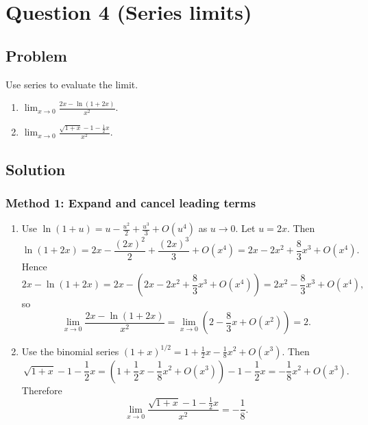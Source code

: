 \documentclass[12pt]{article}
\newcommand{\ds}{\displaystyle}
\begin{document}
\newpage
\section*{Question 4 (Series limits)}
\subsection*{Problem}
Use series to evaluate the limit.
\begin{enumerate}[label=(\alph*)]
  \item \(\ds \lim_{x\to 0}\frac{2x-\ln(1+2x)}{x^2}.\)
  \item \(\ds \lim_{x\to 0}\frac{\sqrt{1+x}-1-\frac12 x}{x^2}.\)
\end{enumerate}

\subsection*{Solution}

\subsubsection*{Method 1: Expand and cancel leading terms}
\begin{enumerate}[label=(\alph*)]
\item Use \(\ln(1+u)=u-\frac{u^2}{2}+\frac{u^3}{3}+O(u^4)\) as \(u\to 0\).
Let \(u=2x\). Then
\[
\ln(1+2x)=2x-\frac{(2x)^2}{2}+\frac{(2x)^3}{3}+O(x^4)=2x-2x^2+\frac{8}{3}x^3+O(x^4).
\]
Hence
\[
2x-\ln(1+2x)=2x-\left(2x-2x^2+\frac{8}{3}x^3+O(x^4)\right)=2x^2-\frac{8}{3}x^3+O(x^4),
\]
so
\[
\lim_{x\to 0}\frac{2x-\ln(1+2x)}{x^2}=\lim_{x\to 0}\left(2-\frac{8}{3}x+O(x^2)\right)=\boxed{2}.
\]

\item Use the binomial series \((1+x)^{1/2}=1+\frac12 x-\frac18 x^2+O(x^3)\).
Then
\[
\sqrt{1+x}-1-\frac12 x=\left(1+\frac12 x-\frac18 x^2+O(x^3)\right)-1-\frac12 x
=-\frac18 x^2+O(x^3).
\]
Therefore
\[
\lim_{x\to 0}\frac{\sqrt{1+x}-1-\frac12 x}{x^2}=\boxed{-\frac18}.
\]
\end{enumerate}
\end{document}
